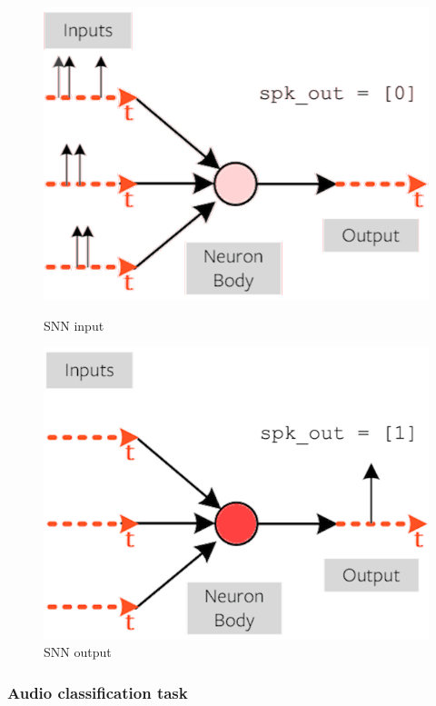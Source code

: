 \documentclass[11pt]{article}
\begin{document}
\begin{figure}[h]
  \centering
  \begin{minipage}{0.45\textwidth}
    \centering
    \includegraphics[width=1\textwidth]{image/def1.png}
    \caption{SNN input}
  \end{minipage}\hfill
  \begin{minipage}{0.45\textwidth}
    \centering
    \includegraphics[width=1\textwidth]{image/def2.png}
    \caption{SNN output}
  \end{minipage}
\end{figure}

\pagebreak

\subsubsection{Audio classification task}
\end{document}
